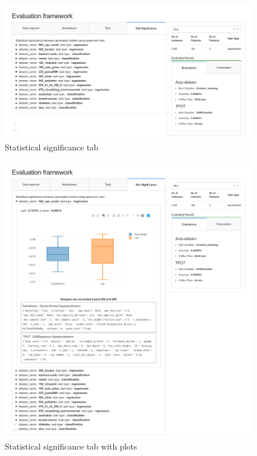 \begin{figure}[!h]
    	\centering
    	\includegraphics[width=0.9\linewidth]{thesis_template/images/statistical.png}
    	\caption{Statistical significance tab}
    	\label{fig:signi}
        \end{figure}
        

\begin{figure}[!h]
    	\centering
    	\includegraphics[width=0.9\linewidth]{thesis_template/images/statwithgraph.png}
    	\caption{Statistical significance tab with plots}
    	\label{fig:signiplots}
        \end{figure}